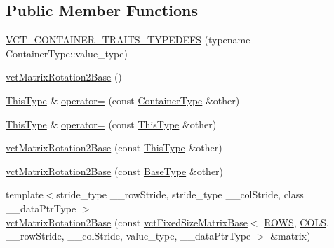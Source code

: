 \subsection*{Public Member Functions}
\begin{DoxyCompactItemize}
\item 
\hyperlink{classvct_matrix_rotation2_base_a53f93373826dfea7f2e7beb62a1a3072}{V\+C\+T\+\_\+\+C\+O\+N\+T\+A\+I\+N\+E\+R\+\_\+\+T\+R\+A\+I\+T\+S\+\_\+\+T\+Y\+P\+E\+D\+E\+F\+S} (typename Container\+Type\+::value\+\_\+type)
\item 
\hyperlink{classvct_matrix_rotation2_base_a6950e81d5174a508ec620833f22f94c2}{vct\+Matrix\+Rotation2\+Base} ()
\item 
\hyperlink{classvct_matrix_rotation2_base_a47ffeef2ddecede4b16bcc88fb432ff5}{This\+Type} \& \hyperlink{classvct_matrix_rotation2_base_a97e26b1d8cdc2115b5226131f8855257}{operator=} (const \hyperlink{classvct_matrix_rotation2_base_ace2b6ba4773b1688b757cec782686180}{Container\+Type} \&other)
\item 
\hyperlink{classvct_matrix_rotation2_base_a47ffeef2ddecede4b16bcc88fb432ff5}{This\+Type} \& \hyperlink{classvct_matrix_rotation2_base_a8a73afa863de9fe734e328c3a9c5f2a3}{operator=} (const \hyperlink{classvct_matrix_rotation2_base_a47ffeef2ddecede4b16bcc88fb432ff5}{This\+Type} \&other)
\item 
\hyperlink{classvct_matrix_rotation2_base_aa750cca07042d1c31d4845deb0ac86ad}{vct\+Matrix\+Rotation2\+Base} (const \hyperlink{classvct_matrix_rotation2_base_a47ffeef2ddecede4b16bcc88fb432ff5}{This\+Type} \&other)
\item 
\hyperlink{classvct_matrix_rotation2_base_a527f575ac195d968387cb5d59c64e39e}{vct\+Matrix\+Rotation2\+Base} (const \hyperlink{classvct_matrix_rotation2_base_a3ce93aa444c1fadbc26ed0d5582ad33a}{Base\+Type} \&other)
\item 
{\footnotesize template$<$stride\+\_\+type \+\_\+\+\_\+row\+Stride, stride\+\_\+type \+\_\+\+\_\+col\+Stride, class \+\_\+\+\_\+data\+Ptr\+Type $>$ }\\\hyperlink{classvct_matrix_rotation2_base_a42cc8718e18541d2dce30213fd62119e}{vct\+Matrix\+Rotation2\+Base} (const \hyperlink{classvct_fixed_size_matrix_base}{vct\+Fixed\+Size\+Matrix\+Base}$<$ \hyperlink{classvct_matrix_rotation2_base_aee21d1136c8b273c716774ceb24ea31bad80015187d3670804554f4bd9cec3822}{R\+O\+W\+S}, \hyperlink{classvct_matrix_rotation2_base_aee21d1136c8b273c716774ceb24ea31babf5d0d692c30b7a19cc0c63d2bcc2113}{C\+O\+L\+S}, \+\_\+\+\_\+row\+Stride, \+\_\+\+\_\+col\+Stride, value\+\_\+type, \+\_\+\+\_\+data\+Ptr\+Type $>$ \&matrix)

\end{DoxyCompactItemize}
